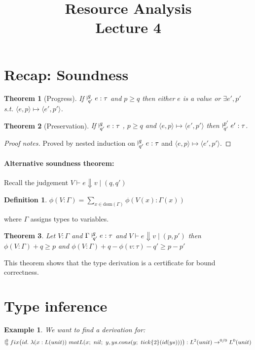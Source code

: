 \documentclass{article}
\title{Resource Analysis \\ \Large{Lecture 4}}
\newtheorem{theorem}{Theorem}[section]
\newtheorem{definition}{Definition}[theorem]
\newtheorem{example}{Example}
\newcommand{\ldash}[2]{\vdash^{\hspace{-.4em}#1}_{\hspace{-.4em}#2}}
\begin{document}
\maketitle
\section{Recap: Soundness}

\begin{theorem}[Progress]
If $\ldash{q}{q'} e : \tau $ and $p \geq q$ then either $e$ is a value or $\exists e',p'$ s.t. $\langle e,p \rangle \mapsto \langle e',p'\rangle$.
\end{theorem}

\begin{theorem}[Preservation]
If $\ldash{q}{q'} e : \tau$ , $p \geq q$ and   $\langle e,p \rangle \mapsto \langle e',p'\rangle$ then $\ldash{p'}{q'} e': \tau$.
\end{theorem}
\begin{proof}[Proof notes]
  Proved by nested induction on $\ldash{q}{q'} e : \tau$ and $\langle e,p \rangle \mapsto \langle e',p'\rangle$.
\end{proof}

\paragraph{Alternative soundness theorem:}

Recall the judgement $V \vdash e \Downarrow v \mid (q,q')$
\begin{definition}
$\phi(V : \Gamma) = \sum_{x \in \text{dom}(\Gamma)} \phi(V(x) : \Gamma(x)) $
\end{definition}
where $\Gamma $ assigns types to variables.

\begin{theorem}
Let $V : \Gamma$ and $\Gamma \ldash{q}{q'} e : \tau$ and $V \vdash e \Downarrow v \mid (p,p')$ then $\phi(V:\Gamma) + q \geq p$ and $\phi (V : \Gamma) +  q - \phi (v : \tau) -q' \geq p - p'$
\end{theorem}

This theorem shows that the type derivation is a certificate for bound correctness.


\section{Type inference}

\begin{example}
We want to find a derivation for:
\[\ldash{0}{0} fix\big(id .\ \lambda(x : L(unit)) 
    \ matL(x;\ nil;\ y,ys.cons(y;\ tick\{2\} (id (ys)))\big) : L^2(unit) \rightarrow^{0/0} L^0(unit)\]
\end{example}
  
\end{document}
